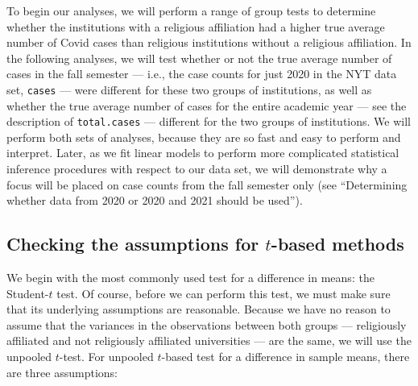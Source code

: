 \documentclass[
]{article}
\begin{document}
To begin our analyses, we will perform a range of group tests to
determine whether the institutions with a religious affiliation had a
higher true average number of Covid cases than religious institutions
without a religious affiliation. In the following analyses, we will test
whether or not the true average number of cases in the fall semester ---
i.e., the case counts for just 2020 in the NYT data set, \texttt{cases}
--- were different for these two groups of institutions, as well as
whether the true average number of cases for the entire academic year
--- see the description of \texttt{total.cases} --- different for the
two groups of institutions. We will perform both sets of analyses,
because they are so fast and easy to perform and interpret. Later, as we
fit linear models to perform more complicated statistical inference
procedures with respect to our data set, we will demonstrate why a focus
will be placed on case counts from the fall semester only (see
``Determining whether data from 2020 or 2020 and 2021 should be used'').

\hypertarget{checking-the-assumptions-for-t-based-methods}{%
\subsection{\texorpdfstring{Checking the assumptions for \(t\)-based
methods}{Checking the assumptions for t-based methods}}\label{checking-the-assumptions-for-t-based-methods}}

We begin with the most commonly used test for a difference in means: the
Student-\(t\) test. Of course, before we can perform this test, we must
make sure that its underlying assumptions are reasonable. Because we
have no reason to assume that the variances in the observations between
both groups --- religiously affiliated and not religiously affiliated
universities --- are the same, we will use the unpooled \(t\)-test. For
unpooled \(t\)-based test for a difference in sample means, there are
three assumptions:
\end{document}
